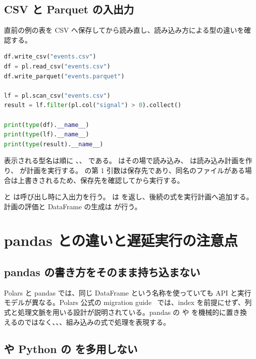 \subsection{CSV と Parquet の入出力}

直前の例の表を CSV へ保存してから読み直し、読み込み方による型の違いを確認する。

\begin{lstlisting}[language=Python]
df.write_csv("events.csv")
df = pl.read_csv("events.csv")
df.write_parquet("events.parquet")

lf = pl.scan_csv("events.csv")
result = lf.filter(pl.col("signal") > 0).collect()

print(type(df).__name__)
print(type(lf).__name__)
print(type(result).__name__)
\end{lstlisting}

表示される型名は順に 、、 である。 はその場で読み込み、 は読み込み計画を作り、 が計画を実行する。 の第 1 引数は保存先であり、同名のファイルがある場合は上書きされるため、保存先を確認してから実行する。

 と  は呼び出し時に入出力を行う。 は  を返し、後続の式を実行計画へ追加する。計画の評価と DataFrame の生成は  が行う。

\section{pandas との違いと遅延実行の注意点}

\subsection{pandas の書き方をそのまま持ち込まない}

Polars と pandas では、同じ DataFrame という名称を使っていても API と実行モデルが異なる。Polars 公式の migration guide~\cite{polars_from_pandas} では、index を前提にせず、列式と処理文脈を用いる設計が説明されている。pandas の  や  を機械的に置き換えるのではなく、、、組み込みの式で処理を表現する。

\subsection{ や Python の  を多用しない}

